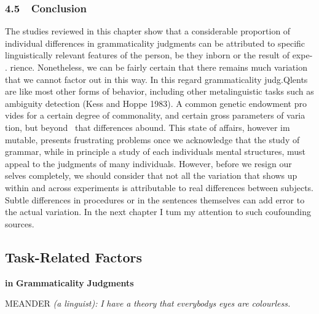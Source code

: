 \clearpage\setcounter{page}{1}\subsubsection[4.5\ \ Conclusion]{4.5\ \ Conclusion}
\begin{styleTextbody}
The studies reviewed in this chapter show that a considerable proportion of individual differences in grammaticality judgments can be attributed to specific linguistically relevant features of the person, be they inborn or the result of expe- . rience. Nonetheless, we can be fairly certain that there remains much variation that we cannot factor out in this way. In this regard grammaticality judg.Qlents are like most other forms of behavior, including other metalinguistic tasks such as ambiguity detection (Kess and Hoppe 1983). A common genetic endowment pro\- vides for a certain degree of commonality, and certain gross parameters of varia\- tion, but beyond \ that differences abound. This state of affairs, however im\- mutable, presents frustrating problems once we acknowledge that the study of grammar, while in principle a study of each individual{\textquotesingle}s mental structures, must appeal to the judgments of many individuals. However, before we resign our\- selves completely, we should consider that not all the variation that shows up within and across experiments is attributable to real differences between subjects. Subtle differences in procedures or in the sentences themselves can add error to the actual variation. In the next chapter I tum my attention to such coufounding sources.
\end{styleTextbody}


\clearpage\setcounter{page}{1}\subsection[Task{}-Related Factors]{Task-Related Factors}
\begin{styleStandard}
\textbf{in}\textbf{ }\textbf{Grammaticality}\textbf{ }\textbf{Judgments}
\end{styleStandard}


\begin{styleStandard}
MEANDER \textit{(a}\textit{ }\textit{linguist):}\textit{ }\textit{I}\textit{ }\textit{have}\textit{ }\textit{a}\textit{ }\textit{theory}\textit{ }\textit{that}\textit{ }\textit{everybody{\textquotesingle}s}\textit{ }\textit{eyes}\textit{ }\textit{are}\textit{ }\textit{colourless.}
\end{styleStandard}


